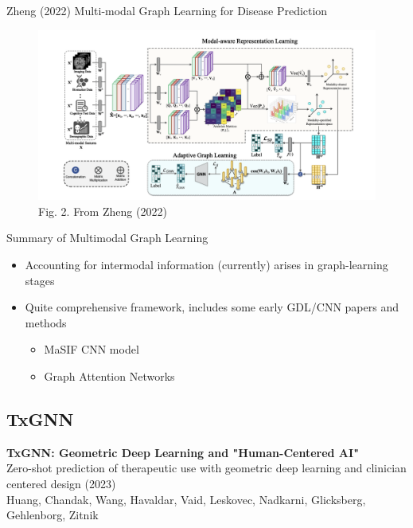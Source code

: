 \documentclass{beamer}
\begin{document}
\begin{frame}{Zheng (2022) Multi-modal Graph Learning for Disease Prediction }
    \begin{figure}
        \centering 
        \includegraphics[scale=0.4]{Zheng_2022_MGL_Patients_Arch.png}
        \caption{Fig. 2. From Zheng (2022) \cite{zheng_multi-modal_2022}}
    \end{figure}
\end{frame}




\begin{frame}{Summary of Multimodal Graph Learning}
    \begin{itemize}\setlength\itemsep{6mm}
        \item Accounting for intermodal information (currently) arises in graph-learning stages 
        \item Quite comprehensive framework, includes some early GDL/CNN papers and methods 
        \begin{itemize}
            \item MaSIF CNN model
            \item Graph Attention Networks 
        \end{itemize} 
    \end{itemize}
\end{frame}


\subsection{TxGNN}

\begin{frame}{}
    \textbf{\Large TxGNN: Geometric Deep Learning and "Human-Centered AI"}  \\
    \vspace{5mm}
    Zero-shot prediction of therapeutic use with geometric deep learning and clinician centered design (2023) \\ 
    Huang, Chandak, Wang, Havaldar, Vaid, Leskovec, Nadkarni, Glicksberg, Gehlenborg, Zitnik
\end{frame}
\end{document}
